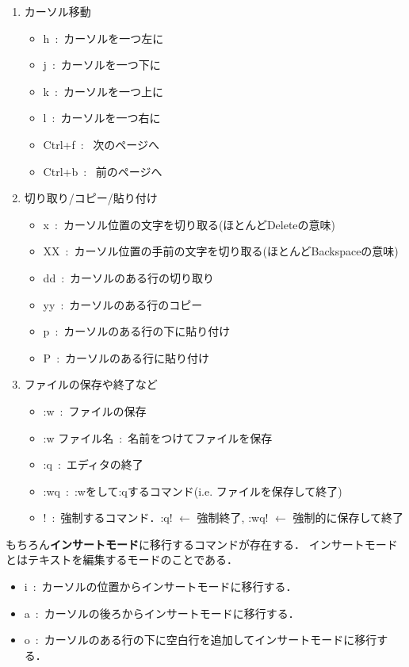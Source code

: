 \documentclass[dvipdfmx,a4paper,11pt]{jsbook}
\begin{document}
\begin{enumerate}
  \item カーソル移動
  \begin{itemize}
    \item h\ :\ カーソルを一つ左に
    \item j\ :\ カーソルを一つ下に
    \item k\ :\ カーソルを一つ上に
    \item l\ :\ カーソルを一つ右に
    \item Ctrl+f\ : \ 次のページへ
    \item Ctrl+b\ : \ 前のページへ
  \end{itemize}
  \item 切り取り/コピー/貼り付け
  \begin{itemize}
    \item x\ :\ カーソル位置の文字を切り取る(ほとんどDeleteの意味)
    \item XX\ :\ カーソル位置の手前の文字を切り取る(ほとんどBackspaceの意味)
    \item dd\ :\ カーソルのある行の切り取り
    \item yy\ :\ カーソルのある行のコピー
    \item p\ :\ カーソルのある行の下に貼り付け
    \item P\ :\ カーソルのある行に貼り付け
  \end{itemize}
  \item ファイルの保存や終了など
  \begin{itemize}
    \item :w\ :\ ファイルの保存
    \item :w ファイル名\ :\ 名前をつけてファイルを保存
    \item :q\ :\ エディタの終了
    \item :wq\ :\ :wをして:qするコマンド(i.e. ファイルを保存して終了)
    \item !\ :\ 強制するコマンド．:q! $\leftarrow$ 強制終了, :wq! $\leftarrow$ 強制的に保存して終了
  \end{itemize}
\end{enumerate}
もちろん\textbf{インサートモード}に移行するコマンドが存在する．
インサートモードとはテキストを編集するモードのことである．
\begin{itemize}
  \item i\ :\ カーソルの位置からインサートモードに移行する．
  \item a\ :\ カーソルの後ろからインサートモードに移行する．
  \item o\ :\ カーソルのある行の下に空白行を追加してインサートモードに移行する．
\end{itemize}
\end{document}

